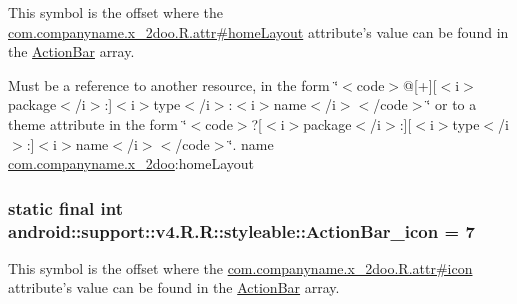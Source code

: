 This symbol is the offset where the \hyperlink{classcom_1_1companyname_1_1x__2doo_1_1_r_1_1attr_132370e7961bf4fac4857ec68acf65b4}{com.companyname.x\_\-2doo.R.attr\#homeLayout} attribute's value can be found in the \hyperlink{classandroid_1_1support_1_1v4_1_1_r_1_1styleable_5c6cf2c83551ebae05f365bb913fdddf}{ActionBar} array.

Must be a reference to another resource, in the form \char`\"{}$<$code$>$@\mbox{[}+\mbox{]}\mbox{[}$<$i$>$package$<$/i$>$:\mbox{]}$<$i$>$type$<$/i$>$:$<$i$>$name$<$/i$>$$<$/code$>$\char`\"{} or to a theme attribute in the form \char`\"{}$<$code$>$?\mbox{[}$<$i$>$package$<$/i$>$:\mbox{]}\mbox{[}$<$i$>$type$<$/i$>$:\mbox{]}$<$i$>$name$<$/i$>$$<$/code$>$\char`\"{}.  name \hyperlink{namespacecom_1_1companyname_1_1x__2doo}{com.companyname.x\_\-2doo}:homeLayout \hypertarget{classandroid_1_1support_1_1v4_1_1_r_1_1styleable_7ea505dc252b6d9f9dd2c9e6251d35fe}{
\subsubsection[{ActionBar\_\-icon}]{\setlength{\rightskip}{0pt plus 5cm}static final int android::support::v4.R.R::styleable::ActionBar\_\-icon = 7}}
\label{classandroid_1_1support_1_1v4_1_1_r_1_1styleable_7ea505dc252b6d9f9dd2c9e6251d35fe}


This symbol is the offset where the \hyperlink{classcom_1_1companyname_1_1x__2doo_1_1_r_1_1attr_23b2ca661e91819ba4c1a3b260a8ab2e}{com.companyname.x\_\-2doo.R.attr\#icon} attribute's value can be found in the \hyperlink{classandroid_1_1support_1_1v4_1_1_r_1_1styleable_5c6cf2c83551ebae05f365bb913fdddf}{ActionBar} array.

